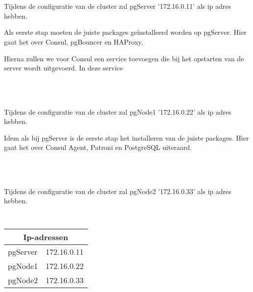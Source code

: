 \section{}
\label{sec:pgServer}
Tijdens de configuratie van de cluster zal pgServer '172.16.0.11' als ip adres hebben.

Als eerste stap moeten de juiste packages geïnstalleerd worden op pgServer. Hier gaat het over Consul, pgBouncer en HAProxy.

Hierna zullen we voor Consul een service toevoegen die bij het opstarten van de server wordt uitgevoerd. In deze service 


\begin{lstlisting}
    
 \end{lstlisting}


\section{}
\label{sec:pgNode1}
Tijdens de configuratie van de cluster zal pgNode1 '172.16.0.22' als ip adres hebben.


Idem als bij pgServer is de eerste stap het installeren van de juiste packages. Hier gaat het over Consul Agent, Patroni en PostgreSQL uiteraard.

\begin{lstlisting}
    
\end{lstlisting}


\section{}
\label{sec:pgNode2}
Tijdens de configuratie van de cluster zal pgNode2 '172.16.0.33' als ip adres hebben.


\begin{lstlisting}
    
\end{lstlisting}


\begin{tabular}{ |p{6cm}||p{6cm}|  }
    \hline
    \multicolumn{2}{|c|}{Ip-adressen} \\
    \hline
    pgServer & 172.16.0.11 \\
    \hline
    pgNode1 & 172.16.0.22 \\
    \hline
    pgNode2 & 172.16.0.33 \\
    \hline
\end{tabular}



